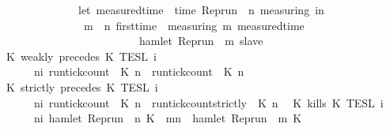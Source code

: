 \begin{isabellebody}
\ \ \ \ \ \ \ \ \ \ \ \ \ \ \ {\isacharparenleft}let\ measured{\isacharunderscore}time\ {\isacharequal}\ time\ {\isacharparenleft}{\isacharparenleft}Rep{\isacharunderscore}run\ {\isasymrho}{\isacharparenright}\ n\ measuring{\isacharparenright}\ in\isanewline
\ \ \ \ \ \ \ \ \ \ \ \ \ \ \ \ {\isasymforall}m\ {\isasymge}\ n{\isachardot}\ first{\isacharunderscore}time\ {\isasymrho}\ measuring\ m\ {\isacharparenleft}measured{\isacharunderscore}time\ {\isacharplus}\ {\isasymdelta}{\isasymtau}{\isacharparenright}\isanewline
\ \ \ \ \ \ \ \ \ \ \ \ \ \ \ \ \ \ \ \ \ \ \ \ \ {\isasymlongrightarrow}\ hamlet\ {\isacharparenleft}{\isacharparenleft}Rep{\isacharunderscore}run\ {\isasymrho}{\isacharparenright}\ m\ slave{\isacharparenright}\isanewline
\ \ \ \ \ \ \ \ \ \ \ \ \ \ \ {\isacharparenright}\isanewline
\ \ \ \ \ \ {\isacharbraceright}{\isacartoucheclose}\isanewline
{\isacharbar}\ {\isacartoucheopen}{\isasymlbrakk}\ K\ weakly\ precedes\ K\ {\isasymrbrakk}\isactrlsub T\isactrlsub E\isactrlsub S\isactrlsub L\isactrlbsup {\isasymge}\ i\isactrlesup \ {\isacharequal}\isanewline
\ \ \ \ \ \ {\isacharbraceleft}{\isasymrho}{\isachardot}\ {\isasymforall}n{\isasymge}i{\isachardot}\ {\isacharparenleft}run{\isacharunderscore}tick{\isacharunderscore}count\ {\isasymrho}\ K\ n{\isacharparenright}\ {\isasymle}\ {\isacharparenleft}run{\isacharunderscore}tick{\isacharunderscore}count\ {\isasymrho}\ K\ n{\isacharparenright}{\isacharbraceright}{\isacartoucheclose}\isanewline
{\isacharbar}\ {\isacartoucheopen}{\isasymlbrakk}\ K\ strictly\ precedes\ K\ {\isasymrbrakk}\isactrlsub T\isactrlsub E\isactrlsub S\isactrlsub L\isactrlbsup {\isasymge}\ i\isactrlesup \ {\isacharequal}\isanewline
\ \ \ \ \ \ {\isacharbraceleft}{\isasymrho}{\isachardot}\ {\isasymforall}n{\isasymge}i{\isachardot}\ {\isacharparenleft}run{\isacharunderscore}tick{\isacharunderscore}count\ {\isasymrho}\ K\ n{\isacharparenright}\ {\isasymle}\ {\isacharparenleft}run{\isacharunderscore}tick{\isacharunderscore}count{\isacharunderscore}strictly\ {\isasymrho}\ K\ n{\isacharparenright}{\isacharbraceright}{\isacartoucheclose}\isanewline
{\isacharbar}\ {\isacartoucheopen}{\isasymlbrakk}\ K\ kills\ K\ {\isasymrbrakk}\isactrlsub T\isactrlsub E\isactrlsub S\isactrlsub L\isactrlbsup {\isasymge}\ i\isactrlesup \ {\isacharequal}\isanewline
\ \ \ \ \ \ {\isacharbraceleft}{\isasymrho}{\isachardot}\ {\isasymforall}n{\isasymge}i{\isachardot}\ hamlet\ {\isacharparenleft}{\isacharparenleft}Rep{\isacharunderscore}run\ {\isasymrho}{\isacharparenright}\ n\ K\ {\isasymlongrightarrow}\ {\isacharparenleft}{\isasymforall}m{\isasymge}n{\isachardot}\ {\isasymnot}\ hamlet\ {\isacharparenleft}{\isacharparenleft}Rep{\isacharunderscore}run\ {\isasymrho}{\isacharparenright}\ m\ K\isanewline

\end{isabellebody}
